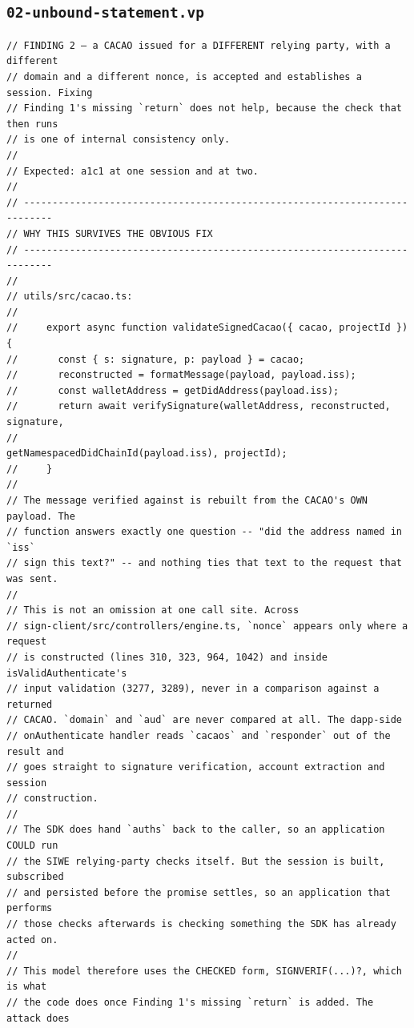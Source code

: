 \documentclass[11pt]{article}
\begin{document}
\subsection{\texorpdfstring{\texttt{02-unbound-statement.vp}}{02-unbound-statement.vp}}
\label{lst:02-unbound-statement-vp-0}
\begin{lstlisting}
// FINDING 2 — a CACAO issued for a DIFFERENT relying party, with a different
// domain and a different nonce, is accepted and establishes a session. Fixing
// Finding 1's missing `return` does not help, because the check that then runs
// is one of internal consistency only.
//
// Expected: a1c1 at one session and at two.
//
// ---------------------------------------------------------------------------
// WHY THIS SURVIVES THE OBVIOUS FIX
// ---------------------------------------------------------------------------
//
// utils/src/cacao.ts:
//
//     export async function validateSignedCacao({ cacao, projectId }) {
//       const { s: signature, p: payload } = cacao;
//       reconstructed = formatMessage(payload, payload.iss);
//       const walletAddress = getDidAddress(payload.iss);
//       return await verifySignature(walletAddress, reconstructed, signature,
//                                    getNamespacedDidChainId(payload.iss), projectId);
//     }
//
// The message verified against is rebuilt from the CACAO's OWN payload. The
// function answers exactly one question -- "did the address named in `iss`
// sign this text?" -- and nothing ties that text to the request that was sent.
//
// This is not an omission at one call site. Across
// sign-client/src/controllers/engine.ts, `nonce` appears only where a request
// is constructed (lines 310, 323, 964, 1042) and inside isValidAuthenticate's
// input validation (3277, 3289), never in a comparison against a returned
// CACAO. `domain` and `aud` are never compared at all. The dapp-side
// onAuthenticate handler reads `cacaos` and `responder` out of the result and
// goes straight to signature verification, account extraction and session
// construction.
//
// The SDK does hand `auths` back to the caller, so an application COULD run
// the SIWE relying-party checks itself. But the session is built, subscribed
// and persisted before the promise settles, so an application that performs
// those checks afterwards is checking something the SDK has already acted on.
//
// This model therefore uses the CHECKED form, SIGNVERIF(...)?, which is what
// the code does once Finding 1's missing `return` is added. The attack does

\end{lstlisting}
\end{document}
